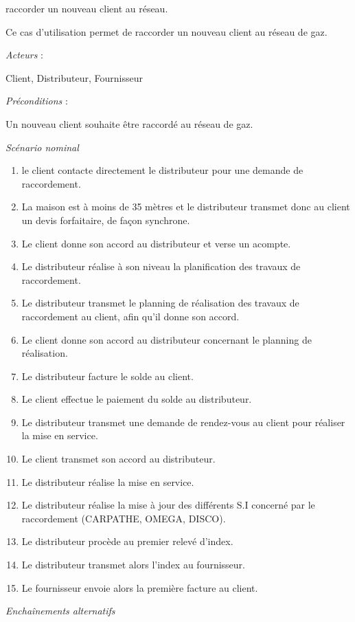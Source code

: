 \documentclass[
12pt,
french,                           %
a4paper,
]{article}
\begin{document}
raccorder un nouveau client au réseau.

Ce cas d'utilisation permet de raccorder un nouveau client au réseau de
gaz.

\emph{Acteurs} :

Client, Distributeur, Fournisseur

\emph{Préconditions} :

Un nouveau client souhaite être raccordé au réseau de gaz.

\emph{Scénario nominal}

\begin{enumerate}[1.]
\item
  le client contacte directement le distributeur pour une demande de
  raccordement.
\item
  La maison est à moins de 35 mètres et le distributeur transmet donc au
  client un devis forfaitaire, de façon synchrone.
\item
  Le client donne son accord au distributeur et verse un acompte.
\item
  Le distributeur réalise à son niveau la planification des travaux de
  raccordement.
\item
  Le distributeur transmet le planning de réalisation des travaux de
  raccordement au client, afin qu'il donne son accord.
\item
  Le client donne son accord au distributeur concernant le planning de
  réalisation.
\item
  Le distributeur facture le solde au client.
\item
  Le client effectue le paiement du solde au distributeur.
\item
  Le distributeur transmet une demande de rendez-vous au client pour
  réaliser la mise en service.
\item
  Le client transmet son accord au distributeur.
\item
  Le distributeur réalise la mise en service.
\item
  Le distributeur réalise la mise à jour des différents S.I concerné par
  le raccordement (CARPATHE, OMEGA, DISCO).
\item
  Le distributeur procède au premier relevé d'index.
\item
  Le distributeur transmet alors l'index au fournisseur.
\item
  Le fournisseur envoie alors la première facture au client.
\end{enumerate}

\emph{Enchaînements alternatifs}
\end{document}
